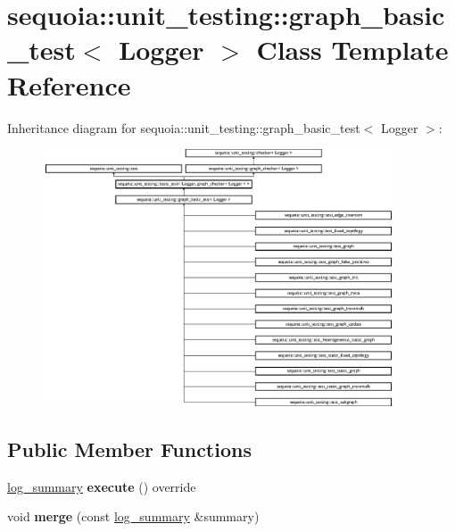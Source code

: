 \hypertarget{classsequoia_1_1unit__testing_1_1graph__basic__test}{}\section{sequoia\+::unit\+\_\+testing\+::graph\+\_\+basic\+\_\+test$<$ Logger $>$ Class Template Reference}
\label{classsequoia_1_1unit__testing_1_1graph__basic__test}
Inheritance diagram for sequoia\+::unit\+\_\+testing\+::graph\+\_\+basic\+\_\+test$<$ Logger $>$\+:\begin{figure}[H]
\begin{center}
\leavevmode
\includegraphics[height=7.609912cm]{classsequoia_1_1unit__testing_1_1graph__basic__test}
\end{center}
\end{figure}
\subsection*{Public Member Functions}
\begin{DoxyCompactItemize}
\item 
\mbox{\label{classsequoia_1_1unit__testing_1_1graph__basic__test_aca4d8c0b1e1c638c951ddeae900c3a4b}} 
\mbox{\hyperlink{classsequoia_1_1unit__testing_1_1log__summary}{log\+\_\+summary}} {\bfseries execute} () override
\item 
\mbox{\label{classsequoia_1_1unit__testing_1_1graph__basic__test_afeea6b7a8587b37425fc7baff3f463de}} 
void {\bfseries merge} (const \mbox{\hyperlink{classsequoia_1_1unit__testing_1_1log__summary}{log\+\_\+summary}} \&summary)
\end{DoxyCompactItemize}
